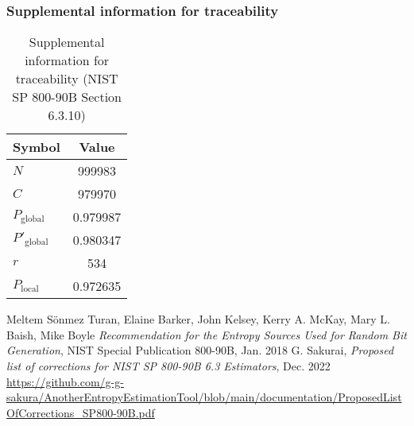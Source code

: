 \documentclass[a3paper,xelatex,english]{bxjsarticle}
\begin{document}
\subsubsection{Supplemental information for traceability}
\renewcommand{\arraystretch}{1.8}
\begin{table}[h]
\caption{Supplemental information for traceability (NIST SP 800-90B Section 6.3.10)}
\begin{center}
\begin{tabular}{|l|c|}
\hline 
\rowcolor{anotherlightblue} %
Symbol				& Value \\ \hline 
$N$				& 999983\\ \hline 
$C$				& 979970\\ \hline 
$P_{\textrm{global}}$				& 0.979987\\ \hline 
$P'_{\textrm{global}}$			& 0.980347\\ \hline 
$r$				& 534\\ \hline 
$P_{\textrm{local}}$ 			& 0.972635\\ \hline
\end{tabular}
\end{center}
\end{table}
\renewcommand{\arraystretch}{1.4}
\begin{thebibliography}{99}
Meltem S\"{o}nmez Turan,
Elaine Barker,
John Kelsey,
Kerry A. McKay,
Mary L. Baish,
Mike Boyle
\textit{Recommendation for the Entropy Sources Used for Random Bit Generation},
NIST Special Publication 800-90B, Jan. 2018
G. Sakurai, \textit{Proposed list of corrections for NIST SP 800-90B 6.3 Estimators}, Dec. 2022
\url{https://github.com/g-g-sakura/AnotherEntropyEstimationTool/blob/main/documentation/ProposedListOfCorrections_SP800-90B.pdf}
\end{thebibliography}
\end{document}
